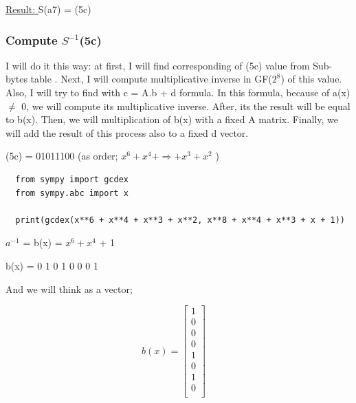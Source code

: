 \documentclass[11pt]{article}
\begin{document}
\underline{Result: }S(a7) = (5c)

\newpage
\subsubsection{Compute $S^{-1}$(5c)}

I will do it this way: at first, I will find corresponding of (5c) value from Sub-bytes table . Next, I will compute multiplicative inverse 
in GF($2^{8}$) of this value.\\

Also, I will try to find with c = A.b + d formula. In this formula, because of a(x) $\neq$ 0, we will compute its multiplicative inverse. After, 
its the result  will be equal to b(x). Then, we will multiplication of b(x) with a fixed A matrix. Finally, we will add the result of 
this process also to a fixed  d vector.

\begin{center}
  (5c) = 01011100 (as order; $x^{6}+x^{4}+ \Longrightarrow +x^{3}+x^{2}$ )
\end{center}

\lstset{language=Python}
\lstset{frame=lines}
\lstset{basicstyle=\footnotesize}
\begin{lstlisting}
  from sympy import gcdex
  from sympy.abc import x

  print(gcdex(x**6 + x**4 + x**3 + x**2, x**8 + x**4 + x**3 + x + 1))

\end{lstlisting}

\begin{center}
  $a^{-1}$ = b(x) = $x^{6} + x^{4}$ + 1
\end{center}

\begin{center}
  b(x) = 0 1 0 1 0 0 0 1 
\end{center}

And we will think as a vector;


\begin{center}
$$b (x) = 
\begin{bmatrix} 
 1\\
 0\\
 0\\
 0\\
 1\\
 0\\
 1\\
 0\\

\end{bmatrix}
\quad
$$
\end{center}
\end{document}
